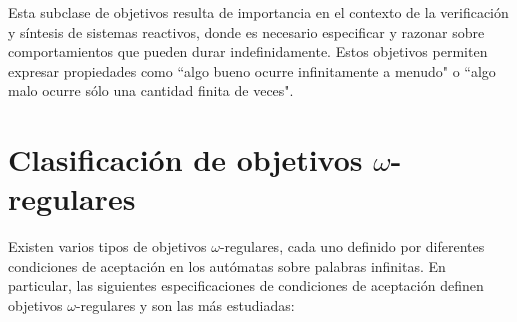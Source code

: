 Esta subclase de objetivos resulta de importancia en el contexto de la
verificación y síntesis de sistemas reactivos, donde es necesario especificar y
razonar sobre comportamientos que pueden durar indefinidamente. Estos objetivos
permiten expresar propiedades como ``algo bueno ocurre infinitamente a menudo"
o ``algo malo ocurre sólo una cantidad finita de veces".

\section{Clasificación de objetivos $\omega$-regulares}

Existen varios tipos de objetivos $\omega$-regulares, cada uno definido por
diferentes condiciones de aceptación en los autómatas sobre palabras infinitas.
En particular, las siguientes especificaciones de condiciones de aceptación
definen objetivos $\omega$-regulares y son las más estudiadas:

